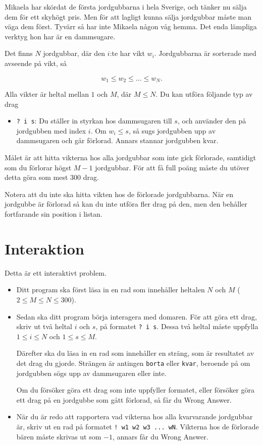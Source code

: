 

Mikaela har skördat de första jordgubbarna i hela Sverige, och tänker nu sälja dem för ett skyhögt pris.
Men för att lagligt kunna sälja jordgubbar måste man väga dem först. Tyvärr så har inte Mikaela någon våg 
hemma. Det enda lämpliga verktyg hon har är en dammsugare.

Det finns $N$ jordgubbar, där den $i$:te har vikt $w_i$. Jordgubbarna är sorterade med avseende på vikt, så 

$$w_1 \leq w_2 \leq \dots \leq w_N.$$ 

Alla vikter är heltal mellan $1$ och $M$, där $M \leq N$. Du kan utföra följande typ av drag
\begin{itemize}
    \item \verb|? i s|: Du ställer in styrkan hos dammsugaren till $s$, och använder den
    på jordgubben med index $i$. Om $w_i \leq s$, så sugs jordgubben upp av dammsugaren och 
    går förlorad. Annars stannar jordgubben kvar.
\end{itemize}

Målet är att hitta vikterna hos alla jordgubbar som inte gick förlorade, samtidigt som du förlorar 
högst $M-1$ jordgubbar. För att få full poäng måste du utöver detta göra som mest $300$ drag.

Notera att du inte ska hitta vikten hos de förlorade jordgubbarna. När en jordgubbe är förlorad så kan du inte 
utföra fler drag på den, men den behåller fortfarande sin position i listan.


\section*{Interaktion}

Detta är ett interaktivt problem.
\begin{itemize}
    \item Ditt program ska först läsa in en rad som innehåller heltalen $N$ och $M$ ($2 \leq M \leq N \leq 300$).
    \item Sedan ska ditt program börja interagera med domaren. För att göra ett drag, skriv ut två heltal $i$ och 
    $s$, på formatet \verb|? i s|. Dessa två heltal måste uppfylla $1 \leq i \leq N$ och $1 \leq s \leq M$.

    Därefter ska du läsa in en rad som innehåller en sträng, som är resultatet av det drag du gjorde. Strängen är antingen
    \verb|borta| eller \verb|kvar|, beroende på om jordgubben sögs upp av dammsugaren eller inte.

    Om du försöker göra ett drag som inte uppfyller formatet, eller försöker göra ett drag på en jordgubbe som gått förlorad, 
    så får du Wrong Answer.

    \item När du är redo att rapportera vad vikterna hos alla kvarvarande jordgubbar är, skriv ut en rad på formatet \verb|! w1 w2 w3 ... wN|.
    Vikterna hos de förlorade bären måste skrivas ut som $-1$, annars får du Wrong Answer.

\end{itemize}

